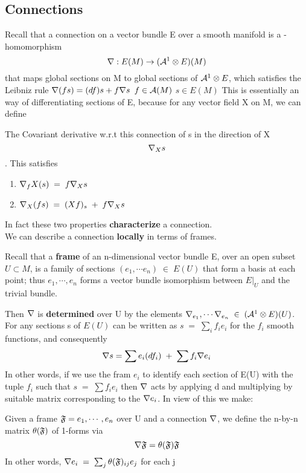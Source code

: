 \subsection{Connections}
Recall that a connection on a vector bundle E over a smooth manifold is a \Cbb-homomorphism 
$$ \nabla:E(M) \rightarrow (\mathcal{A}^{1} \otimes E)(M)$$ 
that maps global sections on M to global sections of $\mathcal{A}^{1} \otimes E$, which satisfies the Leibniz rule
$ \nabla(fs) = (df)s + f \nabla s$   $f \in \mathcal{A}(M)$  $s \in E(M)$
This is essentially an way of differentiating sections of E, because for any vector field X on M, we can define 
\begin{definition}
The Covariant derivative w.r.t this connection of s in the direction of X
 $$\nabla_X s$$. This satisfies
\begin{enumerate}
 \item $\nabla_fX(s) \;=\; f\nabla_X s$
\item $\nabla_X(fs)\;=\;(Xf)_s\;+\;f\nabla_X s$
\end{enumerate}

\end{definition}
In fact these two properties {\bf characterize} a connection.
\\ We can describe a connection {\bf locally} in terms of frames.
\begin{definition}
 Recall that a {\bf frame} of an n-dimensional vector bundle E, over an open subset $U \subset M$, is a family of sections 
$(e_1,\cdots e_n)\;\in\;E(U)$ that form a basis at each point; thus ${e_1,\cdots,e_n}$ forms a vector bundle isomorphism
 between
$E|_U$ and the trivial bundle. 
\end{definition}
Then $\nabla$ is {\bf determined} over U by the elements $\nabla_{e_1},\cdots \nabla_{e_n}\;\in\;(\mathcal{A}^{1} \otimes E)(U)$. For any 
sections 
s of $E(U)$ can be written as $s \; = \;\sum_i f_i e_i$ for the $f_i$ smooth functions, and consequently 
$$\nabla s = \sum e_i(df_i)\;+\;\sum f_i \nabla e_i$$
In other words, if we use the fram ${e_i}$ to identify each section of E(U) with the tuple 
$f_i$ such that $s\;=\;\sum f_i e_i$ then $\nabla$ acts by applying d and multiplying by suitable matrix corresponding to the $\nabla e_i$.
In view of this we make:
\begin{definition}
Given a frame $\mathfrak{F} = {e_1,\cdots,e_n}$ over U and a connection $\nabla$, we define the n-by-n matrix $\theta(\mathfrak{F})$ of 
1-forms via
$$\nabla \mathfrak{F} = \theta(\mathfrak{F})\mathfrak{F}$$
In other words, $\nabla e_i\;=\;\sum_{j}\theta(\mathfrak{F})_{ij} e_j$ for each j
\end{definition}
